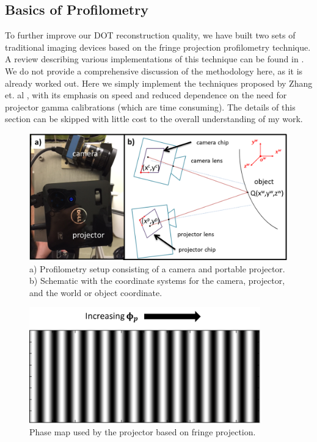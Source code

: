 \subsection{Basics of Profilometry}
To further improve our DOT reconstruction quality, we have built two sets of traditional imaging devices based on the fringe projection profilometry technique. A review describing various implementations of this technique can be found in \cite{Peng2007}. We do not provide a comprehensive discussion of the methodology here, as it is already worked out. Here we simply implement the techniques proposed by Zhang et. al \cite{Zhang2006}, with its emphasis on speed and reduced dependence on the need for projector gamma calibrations (which are time consuming). The details of this section can be skipped with little cost to the overall understanding of my work.
\begin{figure}[b]
\centering
\includegraphics[width=14cm]{./figures/4_Gen3/profcoord.png}
\caption[Schematic of the profilometry setup]{a) Profilometry setup consisting of a camera and portable projector. b) Schematic with the coordinate systems for the camera, projector, and the world or object coordinate.}
\label{fig:profcoord}
\end{figure}
%
\begin{figure}[h]
\centering
\includegraphics[width=10cm]{./figures/4_Gen3/profphasemap.png}
\caption{Phase map used by the projector based on fringe projection.}
\label{fig:profphasemap}
\end{figure}

